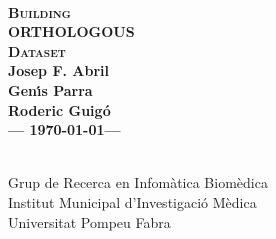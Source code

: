 \documentclass[11pt]{article}
\makeatletter
\let\nwdocspar=\par                    %
\def\mtjabril{\htmladdnormallink{\textbf{jabril@imim.es}}{MAILTO:jabril@imim.es?subject=[8SEQ ORTHOLOGOUS]}}
\makeatother
\begin{document}
\nwdocspar
\thispagestyle{empty}

\begin{titlepage}

\ \vfill
\begin{center}
\textsc{\textbf{\Huge Building\\ ORTHOLOGOUS\\[1ex] Dataset}}\\[5ex]

\textbf{\Large Josep F. Abril}\\[1ex]
\textbf{\Large Gen\'{\i}s Parra}\\[1ex]
\textbf{\Large Roderic Guig\'o}\\[5ex] %

\textbf{\large --- \today ---}\\[10ex]

\begin{abstract}
\begin{center}
\parbox{0.75\linewidth}{
} %
\end{center}
\end{abstract}

\vfill

\begin{raggedleft}
\\
Grup de Recerca en Infom\`atica Biom\`edica\\
Institut Municipal d'Investigaci\'o M\`edica\\
Universitat Pompeu Fabra\\[2ex]
\end{raggedleft}
\end{center}

\end{titlepage} %


\newpage
{}
\setcounter{page}{1}
\pagestyle{fancy}
\renewcommand{\sectionmark}[1]{\markboth{}{\thesection.\ #1}}
\renewcommand{\subsectionmark}[1]{\markboth{}{\thesubsection.\ \textsl{#1}}}
\end{document}
